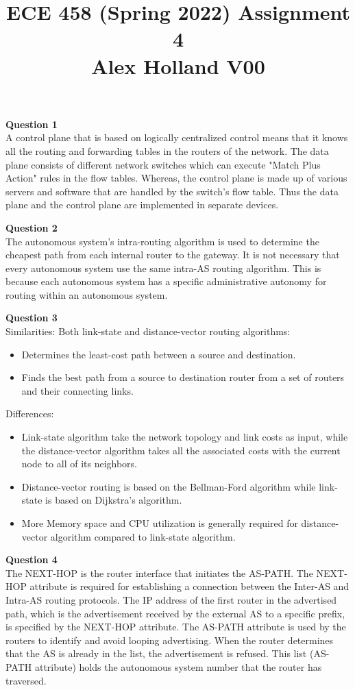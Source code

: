\documentclass{article}
\title{%
   ECE 458 (Spring 2022) Assignment 4 \\
   \large Alex Holland V00}
\date{}
\begin{document}
\maketitle

{\bf Question 1}\\
A control plane that is based on logically centralized control means that it knows all the routing and forwarding tables in the routers of the network. The data plane consists of different network switches which can execute "Match Plus Action" rules in the flow tables. Whereas, the control plane is made up of various servers and software that are handled by the switch's flow table. Thus the data plane and the control plane are implemented in separate devices.

\bigskip
{\bf Question 2}\\
The autonomous system's intra-routing algorithm is used to determine the cheapest path from each internal router to the gateway. It is not necessary that every autonomous system use the same intra-AS routing algorithm. This is because each autonomous system has a specific administrative autonomy for routing within an autonomous system.

\bigskip
{\bf Question 3}\\
Similarities:
Both link-state and distance-vector routing algorithms:
\begin{itemize}
    \item Determines the least-cost path between a source and destination.
    \item Finds the best path from a source to destination router from a set of routers and their connecting links.
\end{itemize}

Differences:
\begin{itemize}
    \item Link-state algorithm take the network topology and link costs as input, while the distance-vector algorithm takes all the associated costs with the current node to all of its neighbors.
    \item Distance-vector routing is based on the Bellman-Ford algorithm while link-state is based on Dijkstra's algorithm.
    \item More Memory space and CPU utilization is generally required for distance-vector algorithm compared to link-state algorithm.
\end{itemize}

\bigskip
{\bf Question 4}\\
The NEXT-HOP is the router interface that initiates the AS-PATH. The NEXT-HOP attribute is required for establishing a connection between the Inter-AS and Intra-AS routing protocols. The IP address of the first router in the advertised path, which is the advertisement received by the external AS to a specific prefix, is specified by the NEXT-HOP attribute. The AS-PATH attribute is used by the routers to identify and avoid looping advertising. When the router determines that the AS is already in the list, the advertisement is refused. This list (AS-PATH attribute) holds the autonomous system number that the router has traversed.
\end{document}
